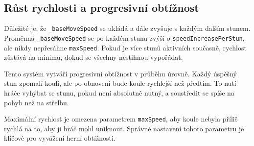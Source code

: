 \subsection{Růst rychlosti a progresivní obtížnost}

Důležité je, že \texttt{\_baseMoveSpeed} se ukládá a dále zvyšuje s každým dalším stunem. Proměnná \texttt{\_baseMoveSpeed} se po každém stunu zvýší o \texttt{speedIncreasePerStun}, ale nikdy nepřesáhne \texttt{maxSpeed}. Pokud je více stunů aktivních současně, rychlost zůstává na minimu, dokud se všechny nestihnou vypořádat.

Tento systém vytváří progresivní obtížnost v průběhu úrovně. Každý úspěšný stun zpomalí kouli, ale po obnovení bude koule rychlejší než předtím. To nutí hráče vyhýbat se stunu, pokud není absolutně nutný, a soustředit se spíše na pohyb než na střelbu.

Maximální rychlost je omezena parametrem \texttt{maxSpeed}, aby koule nebyla příliš rychlá na to, aby ji hráč mohl uniknout. Správné nastavení tohoto parametru je klíčové pro vyvážení herní obtížnosti.